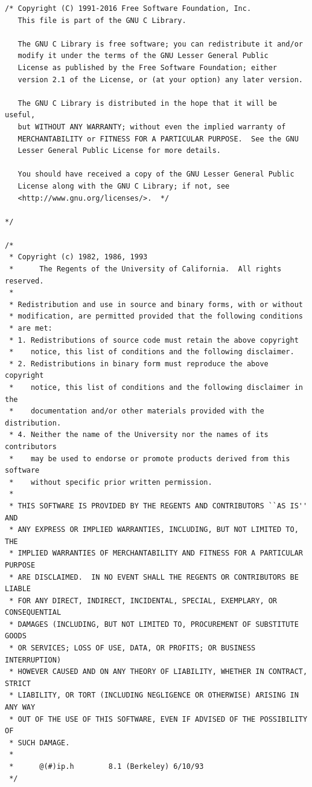 \begin{lstlisting}[caption=Header für libipsec]
/* Copyright (C) 1991-2016 Free Software Foundation, Inc.
   This file is part of the GNU C Library.

   The GNU C Library is free software; you can redistribute it and/or
   modify it under the terms of the GNU Lesser General Public
   License as published by the Free Software Foundation; either
   version 2.1 of the License, or (at your option) any later version.

   The GNU C Library is distributed in the hope that it will be useful,
   but WITHOUT ANY WARRANTY; without even the implied warranty of
   MERCHANTABILITY or FITNESS FOR A PARTICULAR PURPOSE.  See the GNU
   Lesser General Public License for more details.

   You should have received a copy of the GNU Lesser General Public
   License along with the GNU C Library; if not, see
   <http://www.gnu.org/licenses/>.  */

*/

/*
 * Copyright (c) 1982, 1986, 1993
 *      The Regents of the University of California.  All rights reserved.
 *
 * Redistribution and use in source and binary forms, with or without
 * modification, are permitted provided that the following conditions
 * are met:
 * 1. Redistributions of source code must retain the above copyright
 *    notice, this list of conditions and the following disclaimer.
 * 2. Redistributions in binary form must reproduce the above copyright
 *    notice, this list of conditions and the following disclaimer in the
 *    documentation and/or other materials provided with the distribution.
 * 4. Neither the name of the University nor the names of its contributors
 *    may be used to endorse or promote products derived from this software
 *    without specific prior written permission.
 *
 * THIS SOFTWARE IS PROVIDED BY THE REGENTS AND CONTRIBUTORS ``AS IS'' AND
 * ANY EXPRESS OR IMPLIED WARRANTIES, INCLUDING, BUT NOT LIMITED TO, THE
 * IMPLIED WARRANTIES OF MERCHANTABILITY AND FITNESS FOR A PARTICULAR PURPOSE
 * ARE DISCLAIMED.  IN NO EVENT SHALL THE REGENTS OR CONTRIBUTORS BE LIABLE
 * FOR ANY DIRECT, INDIRECT, INCIDENTAL, SPECIAL, EXEMPLARY, OR CONSEQUENTIAL
 * DAMAGES (INCLUDING, BUT NOT LIMITED TO, PROCUREMENT OF SUBSTITUTE GOODS
 * OR SERVICES; LOSS OF USE, DATA, OR PROFITS; OR BUSINESS INTERRUPTION)
 * HOWEVER CAUSED AND ON ANY THEORY OF LIABILITY, WHETHER IN CONTRACT, STRICT
 * LIABILITY, OR TORT (INCLUDING NEGLIGENCE OR OTHERWISE) ARISING IN ANY WAY
 * OUT OF THE USE OF THIS SOFTWARE, EVEN IF ADVISED OF THE POSSIBILITY OF
 * SUCH DAMAGE.
 *
 *      @(#)ip.h        8.1 (Berkeley) 6/10/93
 */


\end{lstlisting}
